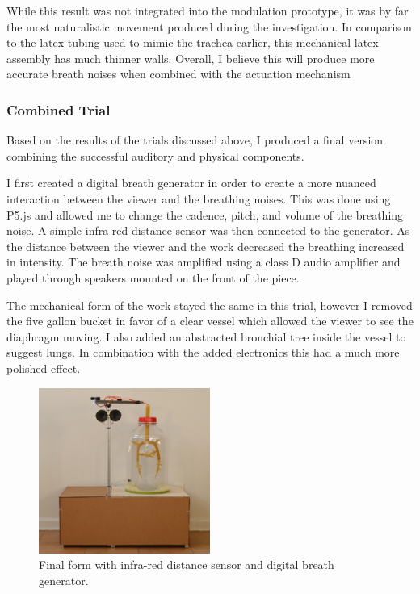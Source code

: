 \documentclass[letterpaper]{article}
\begin{document}
While this result was not integrated into the modulation prototype, it was by far the most naturalistic movement produced during the investigation. In comparison to the latex tubing used to mimic the trachea earlier, this mechanical latex assembly has much thinner walls. Overall, I believe this will produce more accurate breath noises when combined with the actuation mechanism

\subsubsection{Combined Trial}

Based on the results of the trials discussed above, I produced a final version combining the successful auditory and physical components.

I first created a digital breath generator in order to create a more nuanced interaction between the viewer and the breathing noises. This was done using P5.js and allowed me to change the cadence, pitch, and volume of the breathing noise. A simple infra-red distance sensor was then connected to the generator. As the distance between the viewer and the work decreased the breathing increased in intensity. The breath noise was amplified using a class D audio amplifier and played through speakers mounted on the front of the piece. 
 

The mechanical form of the work stayed the same in this trial, however I removed the five gallon bucket in favor of a clear vessel which allowed the viewer to see the diaphragm moving. I also added an abstracted bronchial tree inside the vessel to suggest lungs. In combination with the added electronics this had a much more polished effect.

\begin{figure}[h]
\includegraphics[width=0.5\textwidth]{images/finaltrial.JPG}
\caption{Final form with infra-red distance sensor and digital breath generator.}
\end{figure}
\end{document}
